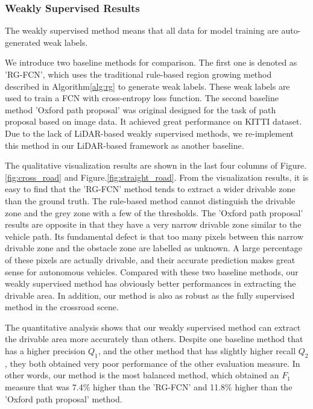 \documentclass[letterpaper, 10 pt, conference]{ieeeconf}  %
\begin{document}
\subsubsection{Weakly Supervised Results}
The weakly supervised method means that all data for model training are auto-generated weak labels.

We introduce two baseline methods for comparison. The first one is denoted as 'RG-FCN', which uses the traditional rule-based region growing method described in Algorithm\ref{alg:rg} to generate weak labels. These weak labels are used to train a FCN\cite{long2015fully} with cross-entropy loss function. The second baseline method 'Oxford path proposal'\cite{barnes2017find} was original designed for the task of path proposal based on image data. It achieved great performance on KITTI dataset\cite{geiger2013vision}. Due to the lack of LiDAR-based weakly supervised methods, we re-implement this method in our LiDAR-based framework as another baseline.

The qualitative visualization results are shown in the last four columns of Figure.\ref{fig:cross_road} and Figure.\ref{fig:straight_road}. From the visualization results, it is easy to find that the 'RG-FCN' method tends to extract a wider drivable zone than the ground truth. The rule-based method cannot distinguish the drivable zone and the grey zone with a few of the thresholds. The 'Oxford path proposal' results are opposite in that they have a very narrow drivable zone similar to the vehicle path. Its fundamental defect is that too many pixels between this narrow drivable zone and the obstacle zone are labelled as unknown. A large percentage of these pixels are actually drivable, and their accurate prediction makes great sense for autonomous vehicles. Compared with these two baseline methods, our weakly supervised method has obviously better performances in extracting the drivable area. In addition, our method is also as robust as the fully supervised method in the crossroad scene.

The quantitative analysis shows that our weakly supervised method can extract the drivable area more accurately than others. Despite one baseline method that has a higher precision $Q_1$, and the other method that has slightly higher recall $Q_2$, they both obtained very poor performance of the other evaluation measure. In other words, our method is the most balanced method, which obtained an $F_1$ measure that was 7.4\% higher than the 'RG-FCN' and 11.8\% higher than the 'Oxford path proposal' method.
\end{document}

